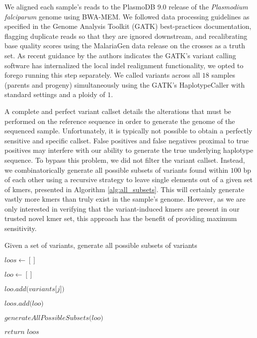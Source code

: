 We aligned each sample's reads to the PlasmoDB 9.0 release of the \textit{Plasmodium falciparum} genome\cite{Gardner:2002p1564,Aurrecoechea:2009hh} using BWA-MEM\cite{Li:2013wn}.  We followed data processing guidelines as specified in the Genome Analysis Toolkit (GATK) best-practices documentation\cite{DePristo:2011fo,McKenna:2010p535}, flagging duplicate reads so that they are ignored downstream, and recalibrating base quality scores using the MalariaGen data release on the crosses as a truth set\cite{huh}.  As recent guidance by the authors indicates the GATK's variant calling software has internalized the local indel realignment functionality, we opted to forego running this step separately.  We called variants across all $18$ samples (parents and progeny) simultaneously using the GATK's HaplotypeCaller with standard settings and a ploidy of $1$.

A complete and perfect variant callset details the alterations that must be performed on the reference sequence in order to generate the genome of the sequenced sample.  Unfortunately, it is typically not possible to obtain a perfectly sensitive and specific callset.  False positives and false negatives proximal to true positives may interfere with our ability to generate the true underlying haplotype sequence.  To bypass this problem, we did not filter the variant callset.  Instead, we combinatorically generate all possible subsets of variants found within $100$ bp of each other using a recursive strategy to leave single elements out of a given set of kmers, presented in Algorithm \ref{alg:all_subsets}.  This will certainly generate vastly more kmers than truly exist in the sample's genome.  However, as we are only interested in verifying that the variant-induced kmers are present in our trusted novel kmer set, this approach has the benefit of providing maximum sensitivity.

\begin{algorithm}
\caption{Given a set of variants, generate all possible subsets of variants}
\label{alg:all_subsets}
\begin{algorithmic}[1]
    \State $\textit{loos} \gets []$

        \State $\textit{loo} \gets []$

                \State $\textit{loo.add(variants[j])}$
            \EndIf
        \EndFor

            \State $\textit{loos.add(loo)}$
        \EndIf

            \State $\textit{generateAllPossibleSubsets(loo)}$
        \EndIf
    \EndFor

    \State $\textit{return loos}$
\EndFunction
\end{algorithmic}
\end{algorithm}

